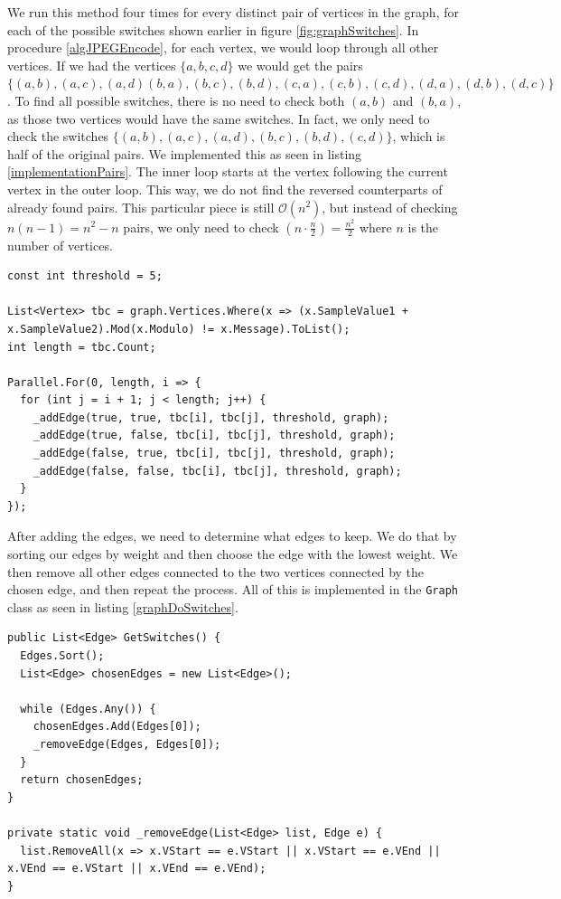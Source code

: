 We run this method four times for every distinct pair of vertices in the graph, for each of the possible switches shown earlier in figure \ref{fig:graphSwitches}.
In procedure \ref{algJPEGEncode}, for each vertex, we would loop through all other vertices.
If we had the vertices $\{a,b,c,d\}$ we would get the pairs $\{(a,b),(a,c),(a,d)(b,a),(b,c),(b,d),(c,a),(c,b),(c,d),(d,a),(d,b),(d,c)\}$.
To find all possible switches, there is no need to check both $(a,b)$ and $(b,a)$, as those two vertices would have the same switches.
In fact, we only need to check the switches $\{(a,b),(a,c),(a,d),(b,c),(b,d),(c,d)\}$, which is half of the original pairs.
We implemented this as seen in listing \ref{implementationPairs}.
The inner loop starts at the vertex following the current vertex in the outer loop.
This way, we do not find the reversed counterparts of already found pairs.
This particular piece is still $\mathcal{O}(n^2)$, but instead of checking $n(n-1)=n^2-n$ pairs, we only need to check $(n\cdot\frac{n}{2})=\frac{n^2}{2}$ where $n$ is the number of vertices. 


\begin{lstlisting}[firstnumber=666,label=implementationPairs,caption={Checks all edges between distincive pairs of vertices \textbf{File: }JPEGImage.cs}]
const int threshold = 5;

List<Vertex> tbc = graph.Vertices.Where(x => (x.SampleValue1 + x.SampleValue2).Mod(x.Modulo) != x.Message).ToList();
int length = tbc.Count;

Parallel.For(0, length, i => {
  for (int j = i + 1; j < length; j++) {
    _addEdge(true, true, tbc[i], tbc[j], threshold, graph);
    _addEdge(true, false, tbc[i], tbc[j], threshold, graph);
    _addEdge(false, true, tbc[i], tbc[j], threshold, graph);
    _addEdge(false, false, tbc[i], tbc[j], threshold, graph);
  }
});
\end{lstlisting}

After adding the edges, we need to determine what edges to keep.
We do that by sorting our edges by weight and then choose the edge with the lowest weight.
We then remove all other edges connected to the two vertices connected by the chosen edge, and then repeat the process.
All of this is implemented in the \lstinline|Graph| class as seen in listing \ref{graphDoSwitches}.

\begin{lstlisting}[firstnumber=17,label=graphDoSwitches, caption={Implementation of the greedy algorithm for choosing switches \textbf{File: }Graph.cs}]
public List<Edge> GetSwitches() {
  Edges.Sort();
  List<Edge> chosenEdges = new List<Edge>();

  while (Edges.Any()) {
    chosenEdges.Add(Edges[0]);
    _removeEdge(Edges, Edges[0]);
  }
  return chosenEdges;
}

private static void _removeEdge(List<Edge> list, Edge e) {
  list.RemoveAll(x => x.VStart == e.VStart || x.VStart == e.VEnd || x.VEnd == e.VStart || x.VEnd == e.VEnd);
}
\end{lstlisting}

